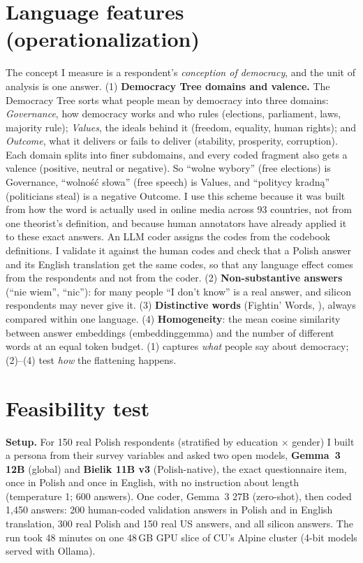 \documentclass[10pt,twocolumn]{article}
\begin{document}
\section{Language features (operationalization)}
The concept I measure is a respondent's \emph{conception of democracy}, and the unit of analysis is one answer. (1) \textbf{Democracy Tree domains and valence.} The Democracy Tree \citep{dahlbergmorkenstam2024} sorts what people mean by democracy into three domains: \emph{Governance}, how democracy works and who rules (elections, parliament, laws, majority rule); \emph{Values}, the ideals behind it (freedom, equality, human rights); and \emph{Outcome}, what it delivers or fails to deliver (stability, prosperity, corruption). Each domain splits into finer subdomains, and every coded fragment also gets a valence (positive, neutral or negative). So ``wolne wybory'' (free elections) is Governance, ``wolność słowa'' (free speech) is Values, and ``politycy kradną'' (politicians steal) is a negative Outcome. I use this scheme because it was built from how the word is actually used in online media across 93 countries, not from one theorist's definition, and because human annotators have already applied it to these exact answers. An LLM coder assigns the codes from the codebook definitions. I validate it against the human codes and check that a Polish answer and its English translation get the same codes, so that any language effect comes from the respondents and not from the coder. (2) \textbf{Non-substantive answers} (``nie wiem'', ``nic''): for many people ``I don't know'' is a real answer, and silicon respondents may never give it. (3) \textbf{Distinctive words} (Fightin' Words, \citealp{monroe2008}), always compared within one language. (4) \textbf{Homogeneity}: the mean cosine similarity between answer embeddings (embeddinggemma) and the number of different words at an equal token budget. (1) captures \emph{what} people say about democracy; (2)--(4) test \emph{how} the flattening happens.

\section{Feasibility test}
\textbf{Setup.} For 150 real Polish respondents (stratified by education $\times$ gender) I built a persona from their survey variables and asked two open models, \textbf{Gemma~3 12B} (global) and \textbf{Bielik 11B v3} (Polish-native), the exact questionnaire item, once in Polish and once in English, with no instruction about length (temperature 1; 600 answers). One coder, Gemma~3 27B (zero-shot), then coded 1,450 answers: 200 human-coded validation answers in Polish and in English translation, 300 real Polish and 150 real US answers, and all silicon answers. The run took 48 minutes on one 48\,GB GPU slice of CU's Alpine cluster (4-bit models served with Ollama).
\end{document}
